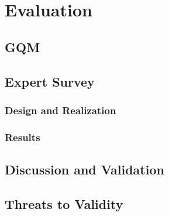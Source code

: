 
\chapter{Evaluation}
\label{chap:ch5}

\section{GQM}
\section{Expert Survey}
\subsection{Design and Realization}
\subsection{Results}
\section{Discussion and Validation}
\section{Threats to Validity}

